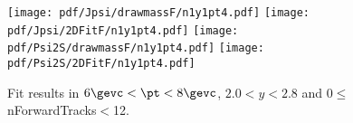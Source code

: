 \begin{figure}[H]
\begin{center}
\texttt{[image: pdf/Jpsi/drawmassF/n1y1pt4.pdf]}
\texttt{[image: pdf/Jpsi/2DFitF/n1y1pt4.pdf]}
\vspace*{-0.5cm}
\texttt{[image: pdf/Psi2S/drawmassF/n1y1pt4.pdf]}
\texttt{[image: pdf/Psi2S/2DFitF/n1y1pt4.pdf]}
\vspace*{-0.5cm}
\end{center}
\caption{Fit results in $6\gevc<\pt<8\gevc$, $2.0<y<2.8$ and 0$\leq$nForwardTracks$<$12.}
\label{Fitn1y1pt4}
\end{figure}
